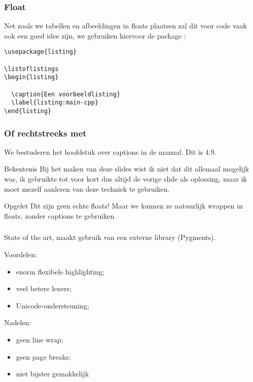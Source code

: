 \begin{frame}[fragile]
  \frametitle{Float}

  Net zoals we tabellen en afbeeldingen in floats plaatsen zal dit voor code vaak ook een goed idee zijn, we gebruiken hiervoor de package :
  \small
  \begin{verbatim}
\usepackage{listing}

\listoflistings
\begin{listing}
  
  \caption{Een voorbeeldlisting}
  \label{listing:main-cpp}
\end{listing}
\end{verbatim}
\end{frame}

\begin{frame}
  \frametitle{Of rechtstreeks met }

  We bestuderen het hoofdstuk over captions in de manual. Dit is 4.9.

  \begin{exampleblock}{Bekentenis}
    Bij het maken van deze slides wist ik niet dat dit allemaal mogelijk was, ik gebruikte tot voor kort dus altijd de vorige slide als oplossing, maar ik moet mezelf aanleren van deze techniek te gebruiken.
  \end{exampleblock}

  \begin{alertblock}{Opgelet}
    Dit zijn geen echte floats! Maar we kunnen ze natuurlijk wrappen in floats, zonder captions te gebruiken.
  \end{alertblock}
\end{frame}

\begin{frame}
  \frametitle{}

  State of the art, maakt gebruik van een externe library (Pygments).

  Voordelen:
  \small
  \begin{itemize}
    \item enorm flexibele highlighting;
    \item veel betere lexers;
    \item Unicode-ondersteuning;
  \end{itemize}

  \normalsize Nadelen:
  \small
  \begin{itemize}
    \item geen line wrap;
    \item geen page breaks;
    \item niet bijster gemakkelijk
  \end{itemize}

\end{frame}

